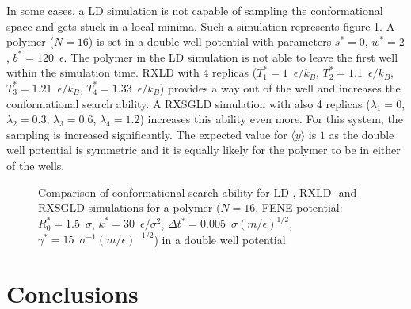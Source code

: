 \documentclass[a4paper]{article}
\begin{document}
In some cases, a LD simulation is not capable of sampling the conformational space and gets stuck in a local minima. Such a simulation represents figure \ref{im:comparison_rxld_rxsgld}. A polymer ($N = 16$) is set in a double well potential with parameters $s^* = 0$, $w^* = 2$, $b^* = 120 \enspace \epsilon$. The polymer in the LD simulation is not able to leave the first well within the simulation time. RXLD with 4 replicas ($T_1^* = 1 \enspace \epsilon/k_B$, $T_2^* = 1.1 \enspace \epsilon/k_B$, $T_3^* = 1.21 \enspace \epsilon/k_B$, $T_4^* = 1.33 \enspace \epsilon/k_B$) provides a way out of the well and increases the conformational search ability. A RXSGLD simulation with also 4 replicas ($\lambda_1 = 0$, $\lambda_2 = 0.3$, $\lambda_3 = 0.6$, $\lambda_4 = 1.2$) increases this ability even more. For this system, the sampling is increased significantly. The expected value for $\langle y \rangle$ is $1$ as the double well potential is symmetric and it is equally likely for the polymer to be in either of the wells.

\begin{figure} [H]
\centering

\caption{Comparison of conformational search ability for LD-, RXLD- and RXSGLD-simulations for a polymer ($N = 16$, FENE-potential: $R_0^* = 1.5 \enspace \sigma$, $k^* = 30 \enspace \epsilon/\sigma^2$, $\Delta t^* = 0.005 \enspace \sigma (m/\epsilon)^{1/2}$, $\gamma^* = 15 \enspace \sigma^{-1} (m/\epsilon)^{-1/2}$) in a double well potential}
\label{im:comparison_rxld_rxsgld}
\end{figure}

\section{Conclusions}
\end{document}
